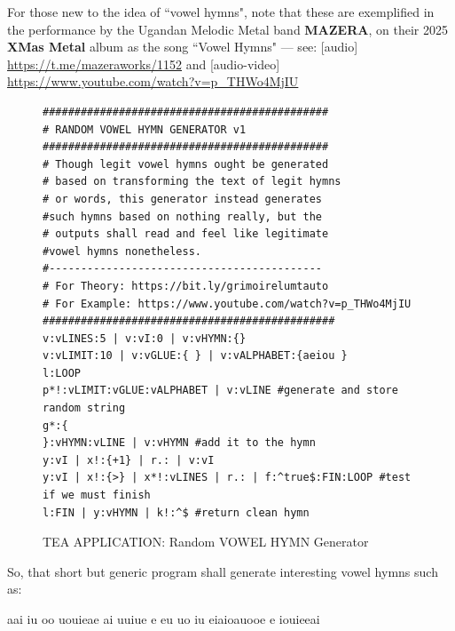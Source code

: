 \documentclass[a4paper, 18pt]{book} %
\begin{document}
{{For those new to the idea of ``vowel hymns"\cite{lutalo_2025_grimlumtauto}, note that these are exemplified in the performance by the Ugandan Melodic Metal band \textbf{MAZERA}, on their 2025 \textbf{XMas Metal} album as the song ``Vowel Hymns" --- see: [audio] \url{https://t.me/mazeraworks/1152} and [audio-video] \url{https://www.youtube.com/watch?v=p_THWo4MjIU}



\vspace{2em}


 \begin{figure}[H]
 \Large
  \begin{tcolorbox}[teaterminalstyle, title=TEA Program:  Random VOWEL HYMN Generator]
    \begin{lstlisting}[language=TEA,breaklines=true,]
#############################################
# RANDOM VOWEL HYMN GENERATOR v1
#############################################
# Though legit vowel hymns ought be generated
# based on transforming the text of legit hymns
# or words, this generator instead generates 
#such hymns based on nothing really, but the
# outputs shall read and feel like legitimate
#vowel hymns nonetheless.
#-------------------------------------------
# For Theory: https://bit.ly/grimoirelumtauto
# For Example: https://www.youtube.com/watch?v=p_THWo4MjIU
##############################################
v:vLINES:5 | v:vI:0 | v:vHYMN:{}
v:vLIMIT:10 | v:vGLUE:{ } | v:vALPHABET:{aeiou }
l:LOOP
p*!:vLIMIT:vGLUE:vALPHABET | v:vLINE #generate and store random string
g*:{
}:vHYMN:vLINE | v:vHYMN #add it to the hymn
y:vI | x!:{+1} | r.: | v:vI 
y:vI | x!:{>} | x*!:vLINES | r.: | f:^true$:FIN:LOOP #test if we must finish
l:FIN | y:vHYMN | k!:^$ #return clean hymn
   \end{lstlisting}
  \end{tcolorbox}
  \caption{TEA APPLICATION: Random VOWEL HYMN Generator}
  \label{FIGP1}
\end{figure}


\vspace{2em}

So, that short but generic program shall generate interesting vowel hymns such as:


\vspace{2em}
  
   \begin{tcbverbatim}[title=Sample Vowel Hymn OUTPUT]
aai iu oo
uouieae ai
uuiue e 
 eu uo iu
eiaioauooe
e iouieeai
  \end{tcbverbatim}
 

}}
\end{document}

